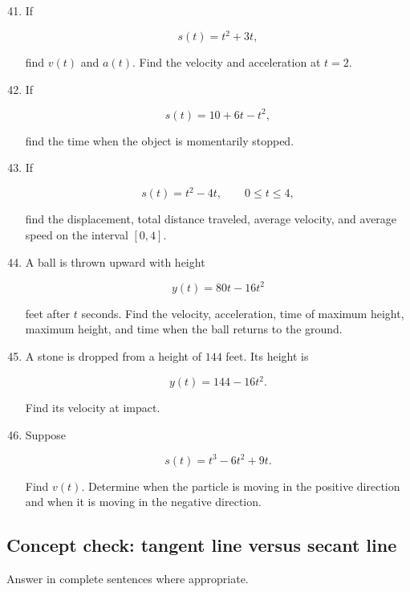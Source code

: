 \begin{enumerate}
\setcounter{enumi}{40}

\item If

\[
s(t)=t^2+3t,
\]

find \(v(t)\) and \(a(t)\).  Find the velocity and acceleration at \(t=2\).

\item If

\[
s(t)=10+6t-t^2,
\]

find the time when the object is momentarily stopped.

\item If

\[
s(t)=t^2-4t,
\qquad 0\le t\le4,
\]

find the displacement, total distance traveled, average velocity, and average speed on the interval \([0,4]\).

\item A ball is thrown upward with height

\[
y(t)=80t-16t^2
\]

feet after \(t\) seconds.  Find the velocity, acceleration, time of maximum height, maximum height, and time when the ball returns to the ground.

\item A stone is dropped from a height of \(144\) feet.  Its height is

\[
y(t)=144-16t^2.
\]

Find its velocity at impact.

\item Suppose

\[
s(t)=t^3-6t^2+9t.
\]

Find \(v(t)\).  Determine when the particle is moving in the positive direction and when it is moving in the negative direction.
\end{enumerate}

\subsection{Concept check: tangent line versus secant line}
\label{subsec:concept-check-tangent-secant}

Answer in complete sentences where appropriate.

